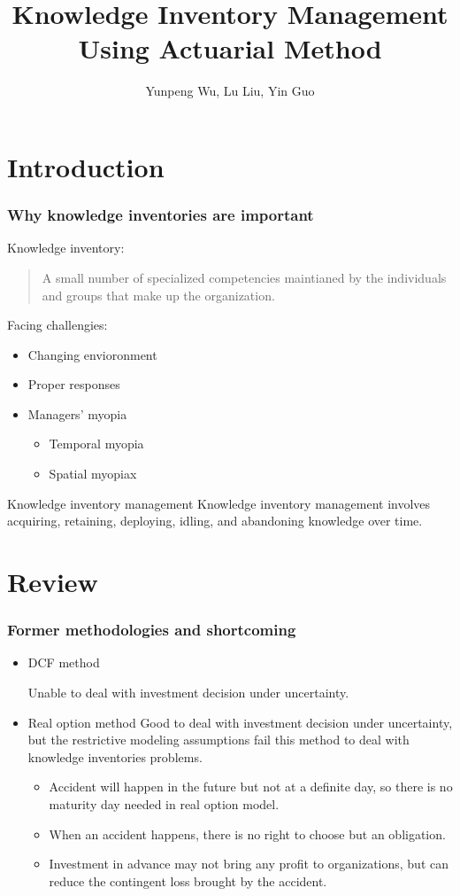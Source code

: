 \documentclass[slidestop,compress,mathserif,table]{beamer}
\begin{document}
\title{Knowledge Inventory Management Using Actuarial Method}
    \author{Yunpeng Wu, Lu Liu, Yin Guo}
    \begin{frame}
      \titlepage
    \end{frame}

\section{Introduction}

\begin{frame}
  \frametitle{Why knowledge inventories are important}
Knowledge inventory:
\begin{quote}
 A small number of specialized competencies maintianed by the
 individuals and groups that make up the organization.
\end{quote}
Facing challengies:
\begin{itemize}
   \item Changing envioronment
     \item Proper responses
       \item Managers' myopia
         \begin{itemize}
         \item Temporal myopia
           \item Spatial myopiax
         \end{itemize}
\end{itemize}
\begin{block}{Knowledge inventory management}
 Knowledge inventory management involves acquiring, retaining, deploying, idling, and abandoning knowledge over time.
\end{block}
\end{frame}


\section{Review}
\begin{frame}
\frametitle{Former methodologies and shortcoming}
\begin{itemize}
\item DCF method

Unable to deal with investment decision under uncertainty.
\item Real option method
  Good to deal with investment decision under uncertainty, but the
  restrictive modeling assumptions fail this method to deal with
  knowledge inventories problems.
  \begin{itemize}
  \item  Accident will happen  in the future but not at a
      definite day, so there is no maturity day needed in real option
      model.
      \item When an accident happens, there is no right to choose but
        an obligation.
        \item Investment in advance may not bring any profit to
          organizations, but can reduce the contingent loss brought by the accident.
  \end{itemize}
\end{itemize}
\end{frame}
\end{document}
